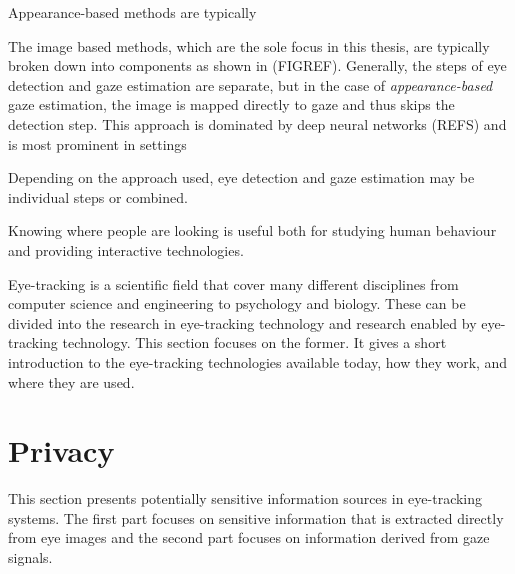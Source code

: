 Appearance-based methods are typically 

The image based methods, which are the sole focus in this thesis, are typically broken down into components as shown in (FIGREF). Generally, the steps of eye detection and gaze estimation are separate, but in the case of \emph{appearance-based} gaze estimation, the image is mapped directly to gaze and thus skips the detection step. This approach is dominated by deep neural networks (REFS) and is most prominent in settings 



Depending on the approach used, eye detection and gaze estimation may be individual steps or combined. 

Knowing where people are looking is useful both for studying human behaviour and providing interactive technologies. 

Eye-tracking is a scientific field that cover many different disciplines from computer science and engineering to psychology and biology. These can be divided into the research in eye-tracking technology and research enabled by eye-tracking technology. This section focuses on the former. It gives a short introduction to the eye-tracking technologies available today, how they work, and where they are used.


\section{Privacy}
This section presents potentially sensitive information sources in eye-tracking systems. The first part focuses on sensitive information that is extracted directly from eye images and the second part focuses on information derived from gaze signals.
